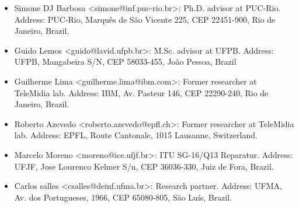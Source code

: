 \begin{itemize}[nosep]
  \item Simone DJ Barbosa <simone@inf.puc-rio.br>: Ph.D. advisor at PUC-Rio. Address: PUC-Rio, Marquês de São Vicente 225, CEP 22451-900, Rio de Janeiro, Brazil.
  \item Guido Lemos <guido@lavid.ufpb.br>: M.Sc. advisor at UFPB. Address: UFPB, Mangabeira S/N, CEP 58033-455, João Pessoa, Brazil
  \item Guilherme Lima <guilherme.lima@ibm.com>: Former researcher at TeleMidia lab. Address: IBM, Av. Pasteur 146, CEP 22290-240, Rio de Janeiro, Brazil.
  \item Roberto Azevedo <roberto.azevedo@epfl.ch>: Former researcher at TeleMidia lab. Address: EPFL, Route Cantonale, 1015 Lausanne, Switzerland.
  \item Marcelo Moreno <moreno@ice.ufjf.br>: ITU SG-16/Q13 Reparatur. Address: UFJF, Jose Lourenco Kelmer S/n, CEP 36036-330, Juiz de Fora, Brazil.
  \item Carlos salles <csalles@deinf.ufma.br>: Research partner. Address: UFMA, Av. dos Portugueses, 1966, CEP 65080-805, São Luís, Brazil.
\end{itemize}
